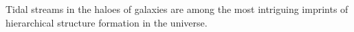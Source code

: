 Tidal streams in the haloes of galaxies are among the most intriguing imprints of hierarchical structure formation in the universe.
